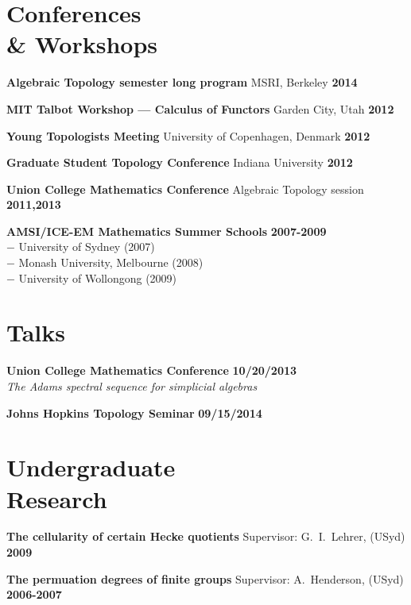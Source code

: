 \documentclass[margin,line]{resume}
\newcommand{\award}[3]{\textbf{#1} #2 \hfill \textbf{#3}
           
\vspace{-2.3mm}}
\newcommand{\twolineaward}[4]{\textbf{#1} #2 \hfill \textbf{#4}\\%
#3
           
\vspace{-2.3mm}}
\begin{document}
\begin{resume}
\vspace{2mm}

\pagebreak

    \section{\mysidestyle Conferences \\ \& Workshops}

\award{Algebraic Topology semester long program}{MSRI, Berkeley}{2014}
\award{MIT Talbot Workshop --- Calculus of Functors}{Garden City, Utah}{2012}
\award{Young Topologists Meeting}{University of Copenhagen, Denmark}{2012}
\award{Graduate Student Topology Conference}{Indiana University}{2012}
\award{Union College Mathematics Conference}{Algebraic Topology session}{2011,2013}
\twolineaward{AMSI/ICE-EM Mathematics Summer Schools}{}{%
\phantom{space}$-$ University of Sydney (2007)\\
\phantom{space}$-$ Monash University, Melbourne (2008)\\
\phantom{space}$-$ University of Wollongong (2009)%
}{2007-2009}

\vspace{2mm}

          \section{\mysidestyle Talks}

\twolineaward{Union College Mathematics Conference}{}{\emph{The Adams spectral sequence for simplicial algebras}}{10/20/2013}
\award{Johns Hopkins Topology Seminar}{}{09/15/2014}


\vspace{2mm}

          \section{\mysidestyle Undergraduate \\ Research}

\award{The cellularity of certain Hecke quotients}{Supervisor: G.\ I.\ Lehrer, (USyd)}{2009}
\award{The permuation degrees of finite groups}{Supervisor: A.\ Henderson, (USyd)}{2006-2007}

\vspace{2mm}
      

\end{resume}
\end{document}
